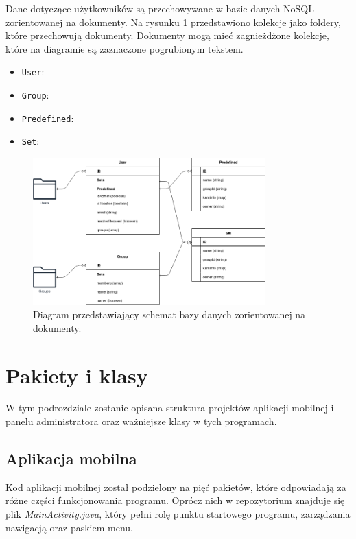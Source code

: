\documentclass[a4paper,twoside,12pt]{book}
\begin{document}
Dane dotyczące użytkowników są przechowywane w bazie danych NoSQL zorientowanej na dokumenty. Na rysunku \ref{fig:firestore} przedstawiono kolekcje jako foldery, które przechowują dokumenty. Dokumenty mogą mieć zagnieżdżone kolekcje, które na diagramie są zaznaczone pogrubionym tekstem. 


\begin{itemize}
\item \texttt{User}:
\item \texttt{Group}:
\item \texttt{Predefined}:
\item \texttt{Set}:
\end{itemize}

\begin{figure}[]
\centering
\includegraphics[width=0.8\textwidth]{firestore.drawio}
\caption{Diagram przedstawiający schemat bazy danych zorientowanej na dokumenty.}
\label{fig:firestore}
\end{figure}

\section{Pakiety i klasy}

W tym podrozdziale zostanie opisana struktura projektów aplikacji mobilnej i panelu administratora oraz ważniejsze klasy w tych programach.

\subsection{Aplikacja mobilna}

Kod aplikacji mobilnej został podzielony na pięć pakietów, które odpowiadają za różne części funkcjonowania programu. Oprócz nich w repozytorium znajduje się plik \textit{MainActivity.java}, który pełni rolę punktu startowego programu, zarządzania nawigacją oraz paskiem menu. 
\end{document}
